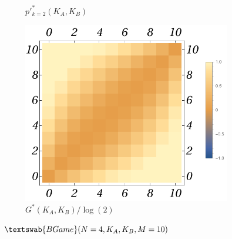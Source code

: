 \documentclass{article}
\theoremstyle{definition}
\newcommand{\BG}[1]{$\textswab{BGame}(#1)$}
\begin{document}
\begin{figure}[H]
\begin{subfigure}[b]{0.3\textwidth}
        \caption{$p'^*_{k=2}(K_A,K_B)$}
        \label{fig:BGame4__10_ppk_2}
    \end{subfigure}
    \hfill %
    \begin{subfigure}[b]{0.3\textwidth}
        \includegraphics[width=\textwidth]{img/GB_Plot_4_10.pdf}
        \caption{$G^*(K_A,K_B)/\log(2)$}
        \label{fig:BGame4__10_G}
    \end{subfigure}
    
    \caption{\BG{N=4,K_A,K_B,M=10}}
    \label{fig:BGame4__10_PppkG}
\end{figure}
\end{document}
